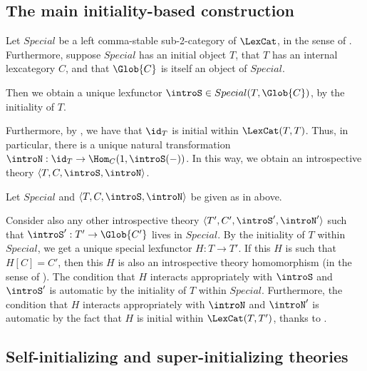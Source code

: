 \subsection{The main initiality-based construction}
\begin{construction}\label{SpecialInitialIntrosp}
Let $Special$ be a left comma-stable sub-2-category of $\LexCat$, in the sense of . Furthermore, suppose $Special$ has an initial object $T$, that $T$ has an internal lexcategory $C$, and that $\Glob{C}$ is itself an object of $Special$.

Then we obtain a unique lexfunctor $\introS \in Special(T, \Glob{C})$, by the initiality of $T$.

Furthermore, by , we have that $\id_T$ is initial within $\LexCat(T, T)$. Thus, in particular, there is a unique natural transformation $\introN : \id_T \to \Hom_C(1, \introS(-))$. In this way, we obtain an introspective theory $\langle T, C, \introS, \introN \rangle$.
\end{construction}

\begin{theorem}
Let $Special$ and $\langle T, C, \introS, \introN \rangle$ be given as in  above.

Consider also any other introspective theory $\langle T', C', \introS', \introN' \rangle$ such that $\introS' : T' \to \Glob{C'}$ lives in $Special$. By the initiality of $T$ within $Special$, we get a unique special lexfunctor $H : T \to T'$. If this $H$ is such that $H[C] = C'$, then this $H$ is also an introspective theory homomorphism (in the sense of ). The condition that $H$ interacts appropriately with $\introS$ and $\introS'$ is automatic by the initiality of $T$ within $Special$. Furthermore, the condition that $H$ interacts appropriately with $\introN$ and $\introN'$ is automatic by the fact that $H$ is initial within $\LexCat(T, T')$, thanks to .
\end{theorem}

\subsection{Self-initializing and super-initializing theories}
